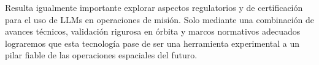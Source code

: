 Resulta igualmente importante explorar aspectos regulatorios y de certificación para el uso de LLMs en operaciones de misión. Solo mediante una combinación de avances técnicos, validación rigurosa en órbita y marcos normativos adecuados lograremos que esta tecnología pase de ser una herramienta experimental a un pilar fiable de las operaciones espaciales del futuro.